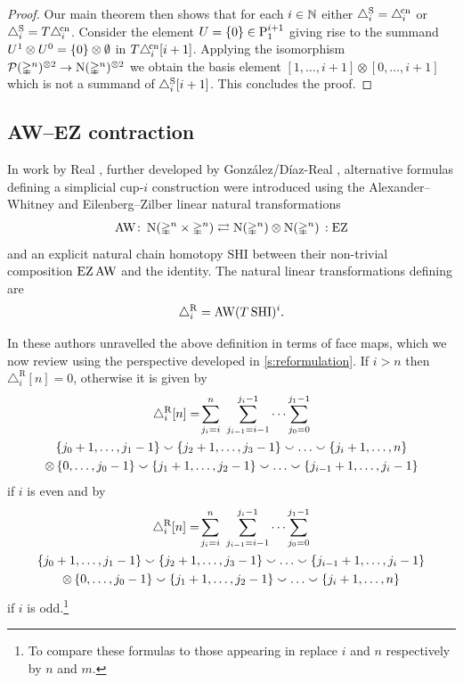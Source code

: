 \begin{proof}
	Our main theorem then shows that for each $i \in \mathbb{N}$ either $\triangle^{\mathrm{S}}_i = \triangle^{\!\mathrm{cn}}_i$ or $\triangle^{\mathrm{S}}_i = T \triangle^{\!\mathrm{cn}}_i$.
	Consider the element $U = \{0\} \in \mathrm{P}_{1}^{i+1}$ giving rise to the summand $U^1 \otimes U^0 = \{0\} \otimes \emptyset$ in $T \triangle^{\!\mathrm{cn}}_i [i+1]$.
	Applying the isomorphism $\mathcal{P}(\mathbb{\Delta}^n)^{\otimes 2} \to \operatorname{N}(\mathbb{\Delta}^n)^{\otimes 2}$ we obtain the basis element $[1,\dots,i+1] \otimes [0,\dots,i+1]$ which is not a summand of $\triangle^{\mathrm{S}}_i [i+1]$.
	This concludes the proof.
\end{proof}

\subsection{AW--EZ contraction}\label{ss:real}

In work by Real \cite{real1996computability}, further developed by Gonz\'alez\-/D\'iaz\--Real \cite{gonzalez-diaz1999steenrod, gonzalez2003computation, gonzalez-diaz2005cocyclic}, alternative formulas defining a simplicial \mbox{cup-$i$} construction were introduced using the Alexander--Whitney and Eilenberg--Zilber linear natural transformations
\[
\operatorname{AW} \colon \operatorname{N}(\mathbb{\Delta}^n \times \mathbb{\Delta}^n)
\rightleftarrows
\operatorname{N}(\mathbb{\Delta}^n) \otimes \operatorname{N}(\mathbb{\Delta}^n) \,: \operatorname{EZ}
\]
and an explicit natural chain homotopy $\mathrm{SHI}$ between their non-trivial composition $\operatorname{EZ} \operatorname{AW}$ and the identity.
The natural linear transformations defining  are
\[
\triangle^{\mathrm{R}}_i = \operatorname{AW} (T \, \mathrm{SHI})^i.
\]

In \cite[Theorem~3.1]{gonzalez-diaz1999steenrod} these authors unravelled the above definition in terms of face maps, which we now review using the perspective developed in \cref{s:reformulation}.
If $i > n$ then $\triangle_i^{\mathrm{R}} [n] = 0$, otherwise it is given by
\begin{multline}\label{eq:real left}
	\triangle^{\mathrm{R}}_i [n] = \!
	\sum_{j_i=i}^{n} \ \sum_{j_{i-1}=i-1}^{j_i-1} \dots \sum_{j_0=0}^{j_1-1} \\
	\{j_0+1,\dots,j_1-1\} \union \{j_2+1,\dots,j_3-1\} \union \dots \union \{j_i+1,\dots,n\} \\ \ot \,
	\{0,\dots,j_0-1\} \union \{j_1+1,\dots,j_2-1\} \union \dots \union \{j_{i-1}+1,\dots,j_i-1\}
\end{multline}
if $i$ is even and by
\begin{multline}\label{eq:real right}
	\triangle^\rR_i [n] = \!
	\sum_{j_i=i}^{n} \ \sum_{j_{i-1}=i-1}^{j_i-1} \dots \sum_{j_0=0}^{j_1-1} \\
	\{j_0+1,\dots,j_1-1\} \union \{j_2+1,\dots,j_3-1\} \union \dots \union \{j_{i-1}+1,\dots,j_i-1\} \\ \ot \,
	\{0,\dots,j_0-1\} \union \{j_1+1,\dots,j_2-1\} \union \dots \union \{j_i+1,\dots,n\}
\end{multline}
if $i$ is odd.\footnote{To compare these formulas to those appearing in \cite[Theorem~3.1]{gonzalez-diaz1999steenrod} replace $i$ and $n$ respectively by $n$ and $m$.}

